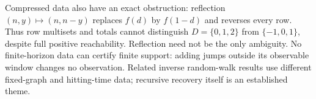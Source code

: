 Compressed data also have an exact obstruction: reflection $(n,y)\mapsto(n,n-y)$ replaces $f(d)$ by $f(1-d)$ and reverses every row. Thus row multisets and totals cannot distinguish $D=\{0,1,2\}$ from $\{-1,0,1\}$, despite full positive reachability. Reflection need not be the only ambiguity. No finite-horizon data can certify finite support: adding jumps outside its observable window changes no observation. Related inverse random-walk results \cite[Theorems 1.5--1.6]{BlastenEtAl}\cite[Theorem 1.1]{DeLaPenaEtAl} use different fixed-graph and hitting-time data; recursive recovery itself is an established theme.

